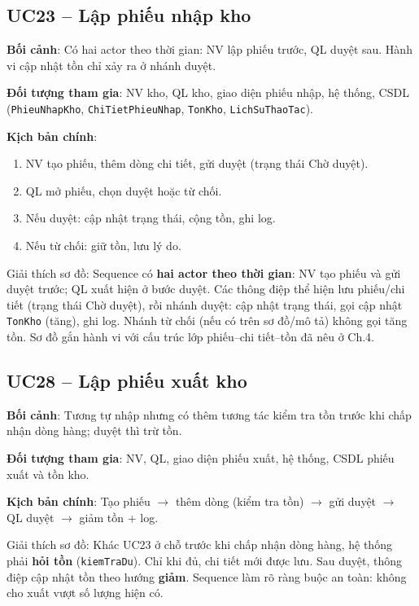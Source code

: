 \subsection{UC23 -- Lập phiếu nhập kho}

\textbf{Bối cảnh}: Có hai actor theo thời gian: NV lập phiếu trước, QL duyệt sau. Hành vi cập nhật tồn chỉ xảy ra ở nhánh duyệt.

\textbf{Đối tượng tham gia}: NV kho, QL kho, giao diện phiếu nhập, hệ thống, CSDL (\texttt{PhieuNhapKho}, \texttt{ChiTietPhieuNhap}, \texttt{TonKho}, \texttt{LichSuThaoTac}).

\textbf{Kịch bản chính}:
\begin{enumerate}[leftmargin=1.5cm]
    \item NV tạo phiếu, thêm dòng chi tiết, gửi duyệt (trạng thái Chờ duyệt).
    \item QL mở phiếu, chọn duyệt hoặc từ chối.
    \item Nếu duyệt: cập nhật trạng thái, cộng tồn, ghi log.
    \item Nếu từ chối: giữ tồn, lưu lý do.
\end{enumerate}



Giải thích sơ đồ: Sequence có \textbf{hai actor theo thời gian}: NV tạo phiếu và gửi duyệt trước; QL xuất hiện ở bước duyệt. Các thông điệp thể hiện lưu phiếu/chi tiết (trạng thái Chờ duyệt), rồi nhánh duyệt: cập nhật trạng thái, gọi cập nhật \texttt{TonKho} (tăng), ghi log. Nhánh từ chối (nếu có trên sơ đồ/mô tả) không gọi tăng tồn. Sơ đồ gắn hành vi với cấu trúc lớp phiếu--chi tiết--tồn đã nêu ở Ch.4.

\subsection{UC28 -- Lập phiếu xuất kho}

\textbf{Bối cảnh}: Tương tự nhập nhưng có thêm tương tác kiểm tra tồn trước khi chấp nhận dòng hàng; duyệt thì trừ tồn.

\textbf{Đối tượng tham gia}: NV, QL, giao diện phiếu xuất, hệ thống, CSDL phiếu xuất và tồn kho.

\textbf{Kịch bản chính}: Tạo phiếu $\rightarrow$ thêm dòng (kiểm tra tồn) $\rightarrow$ gửi duyệt $\rightarrow$ QL duyệt $\rightarrow$ giảm tồn + log.



Giải thích sơ đồ: Khác UC23 ở chỗ trước khi chấp nhận dòng hàng, hệ thống phải \textbf{hỏi tồn} (\texttt{kiemTraDu}). Chỉ khi đủ, chi tiết mới được lưu. Sau duyệt, thông điệp cập nhật tồn theo hướng \textbf{giảm}. Sequence làm rõ ràng buộc an toàn: không cho xuất vượt số lượng hiện có.

